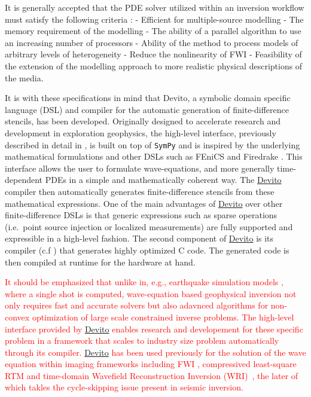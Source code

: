 \documentclass[10pt, conference]{IEEEtran}
\newcommand{\devito}{\href{https://github.com/devitocodes/devito}{Devito} }
\begin{document}
It is generally accepted that the PDE solver utilized within an
inversion workflow must satisfy the following criteria
\cite{virieuxmodelling}: - Efficient for multiple-source modelling - The
memory requirement of the modelling - The ability of a parallel algorithm
to use an increasing number of processors - Ability of the method to
process models of arbitrary levels of heterogeneity - Reduce the
nonlinearity of FWI - Feasibility of the extension of the modelling
approach to more realistic physical descriptions of the media.

It is with these specifications in mind that Devito, a symbolic domain
specific language (DSL) and compiler for the automatic generation of
finite-difference stencils, has been developed. Originally designed to
accelerate research and development in exploration geophysics, the
high-level interface, previously described in detail in \cite{devito-api},
is built on top of \texttt{SymPy} \cite{sympy} and is inspired by the
underlying mathematical formulations and other DSLs such as FEniCS
\cite{fenics} and Firedrake \cite{firedrake}. This interface allows the
user to formulate wave-equations, and more generally time-dependent PDEs
in a simple and mathematically coherent way. The \devito compiler then
automatically generates finite-difference stencils from these mathematical
expressions. One of the main advantages of \devito over other
finite-difference DSLs is that generic expressions such as sparse
operations (i.e.~point source injection or localized measurements) are
fully supported and expressible in a high-level fashion. The second
component of \devito is its compiler (c.f \cite{devito-compiler}) that
generates highly optimized C code. The generated code is then compiled at
runtime for the hardware at hand.

\textcolor{red}{It should be emphasized that unlike in,
e.g., earthquake simulation models \cite{fu201718}, where
a single shot is computed, wave-equation based
geophysical inversion not only requires
fast and accurate solvers but also adavnced algorithms for
non-convex optimization of large scale constrained inverse problems. The 
high-level interface provided by \devito enables research and developement for these 
specific problem in a framework that scales to industry size problem 
automatically through its compiler. \devito has been used previously
for the solution of the wave equation within imaging frameworks including
FWI \cite{witte2018alf}, compressived least-square RTM \cite{witte2018cls} and
time-domain Wavefield Reconstruction Inversion (WRI)~\cite{rizzuti2020EAGEtwri, 
louboutin2020SEGtwri}, the later of which takles the cycle-skipping issue
present in seismic inversion.}
\end{document}

